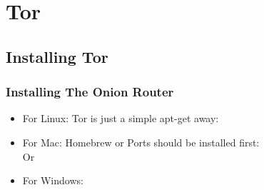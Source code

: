 \documentclass{beamer}
\begin{document}
\section{Tor}
\subsection{Installing Tor}
\begin{frame}
\frametitle{Installing The Onion Router}
\begin{itemize}
\item For Linux: Tor is just a simple apt-get away:\\
\pause
{\color{blue}{sudo apt-get install tor}}
\pause
\item For Mac: Homebrew or Ports should be installed first:\\
\pause{\color{blue}{brew install tor}} Or {\color{blue}{ports install tor}}
\pause
\item For Windows:
\pause
{\color{red}{You're on your own...}}

\end{itemize}
\end{frame}
\end{document}
